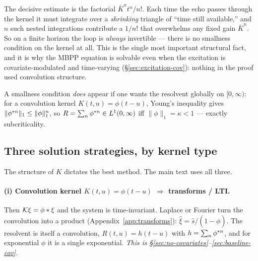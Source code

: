 \begin{intuition}
The decisive estimate is the factorial $\bar K^n t^n/n!$. Each time the echo
passes through the kernel it must integrate over a \emph{shrinking} triangle of
``time still available,'' and $n$ such nested integrations contribute a $1/n!$ that
overwhelms any fixed gain $\bar K^n$. So on a finite horizon the loop is
\emph{always} invertible --- there is no smallness condition on the kernel at all.
This is the single most important structural fact, and it is why the MBPP equation
is solvable even when the excitation is covariate-modulated and time-varying
(\S\ref{sec:excitation-cov}): nothing in the proof used convolution structure.
\end{intuition}

\noindent
A smallness condition \emph{does} appear if one wants the resolvent globally on
$[0,\infty)$: for a convolution kernel $K(t,u)=\phi(t-u)$, Young's inequality gives
$\|\phi^{\ast n}\|_1\le\|\phi\|_1^n$, so $R=\sum_n\phi^{\ast n}\in L^1(0,\infty)$
iff $\|\phi\|_1=\kappa<1$ --- exactly subcriticality.

\subsection{Three solution strategies, by kernel type}

The structure of $K$ dictates the best method. The main text uses all three.

\paragraph{(i) Convolution kernel $K(t,u)=\phi(t-u)$ $\Rightarrow$ transforms / LTI.}
Then $\mathcal K\xi=\phi\ast\xi$ and the system is time-invariant. Laplace or
Fourier turn the convolution into a product (Appendix~\ref{app:transforms}):
$\hat\xi=\hat s/(1-\hat\phi)$. The resolvent is itself a convolution,
$R(t,u)=h(t-u)$ with $h=\sum_n\phi^{\ast n}$, and for exponential $\phi$ it is a
single exponential. \emph{This is \S\ref{sec:no-covariates}--\ref{sec:baseline-cov}.}

